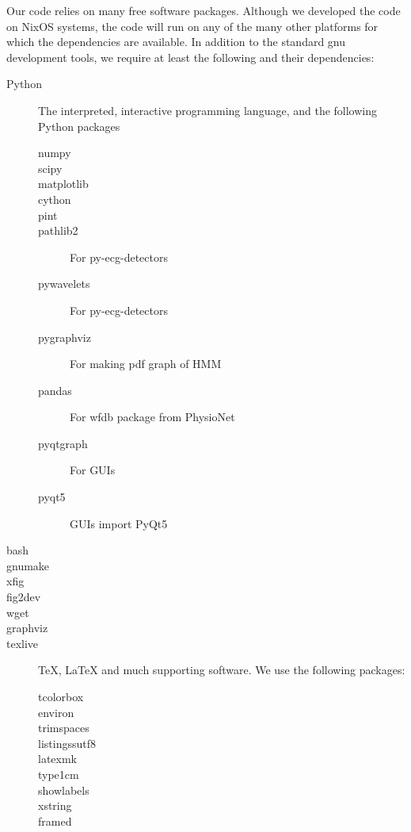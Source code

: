 Our code relies on many free software packages.  Although we developed
the code on NixOS systems, the code will run on any of the many other
platforms for which the dependencies are available.  In addition to
the standard gnu development tools, we require at least the following
and their dependencies:
  \begin{description}
  \item[Python] The interpreted, interactive programming language, and
    the following Python packages
    \begin{description}
    \item[numpy] 
    \item[scipy] 
    \item[matplotlib]
    \item[cython] 
    \item[pint] 
    \item[pathlib2] For py-ecg-detectors
    \item[pywavelets] For py-ecg-detectors
    \item[pygraphviz] For making pdf graph of HMM
    \item[pandas] For wfdb package from PhysioNet
    \item[pyqtgraph] For GUIs
    \item[pyqt5] GUIs import PyQt5
    \end{description}
  \item[bash] 
  \item[gnumake] 
  \item[xfig]
  \item[fig2dev] 
  \item[wget]
  \item[graphviz] 
  \item[texlive] TeX, LaTeX and much supporting software.  We use the
    following packages:
    \begin{description}
    \item[tcolorbox] 
    \item[environ] 
    \item[trimspaces] 
    \item[listingssutf8] 
    \item[latexmk]
    \item[type1cm] 
    \item[showlabels] 
    \item[xstring] 
    \item[framed] 
    \end{description}
  \end{description}


